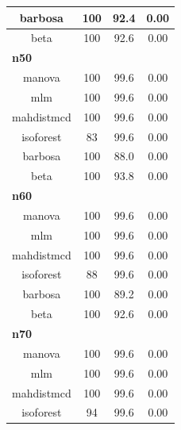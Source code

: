 \documentclass[
]{article}
\begin{document}
\begin{table}
\begin{tabular}[t]{c|c|c|c}
\hline
\hspace{1em}barbosa & 100 & 92.4 & 0.00\\
\hline
\hspace{1em}beta & 100 & 92.6 & \vphantom{1} 0.00\\
\hline
\multicolumn{4}{l}{\textbf{n50}}\\
\hline
\hspace{1em}manova & 100 & 99.6 & \vphantom{5} 0.00\\
\hline
\hspace{1em}mlm & 100 & 99.6 & \vphantom{5} 0.00\\
\hline
\hspace{1em}mahdistmcd & 100 & 99.6 & \vphantom{5} 0.00\\
\hline
\hspace{1em}isoforest & 83 & 99.6 & 0.00\\
\hline
\hspace{1em}barbosa & 100 & 88.0 & 0.00\\
\hline
\hspace{1em}beta & 100 & 93.8 & 0.00\\
\hline
\multicolumn{4}{l}{\textbf{n60}}\\
\hline
\hspace{1em}manova & 100 & 99.6 & \vphantom{4} 0.00\\
\hline
\hspace{1em}mlm & 100 & 99.6 & \vphantom{4} 0.00\\
\hline
\hspace{1em}mahdistmcd & 100 & 99.6 & \vphantom{4} 0.00\\
\hline
\hspace{1em}isoforest & 88 & 99.6 & 0.00\\
\hline
\hspace{1em}barbosa & 100 & 89.2 & 0.00\\
\hline
\hspace{1em}beta & 100 & 92.6 & 0.00\\
\hline
\multicolumn{4}{l}{\textbf{n70}}\\
\hline
\hspace{1em}manova & 100 & 99.6 & \vphantom{3} 0.00\\
\hline
\hspace{1em}mlm & 100 & 99.6 & \vphantom{3} 0.00\\
\hline
\hspace{1em}mahdistmcd & 100 & 99.6 & \vphantom{3} 0.00\\
\hline
\hspace{1em}isoforest & 94 & 99.6 & 0.00\\

\end{tabular}
\end{table}
\end{document}
